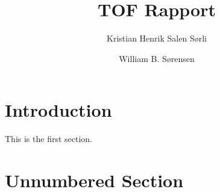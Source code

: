 \documentclass{article}
\author{
  Kristian Henrik Salen Sørli
  \and
  William B. Sørensen\\
}
\title{TOF Rapport}
\begin{document}
\maketitle

\tableofcontents

\section{Introduction}

This is the first section.

\section*{Unnumbered Section}

\blindtext
\end{document}
